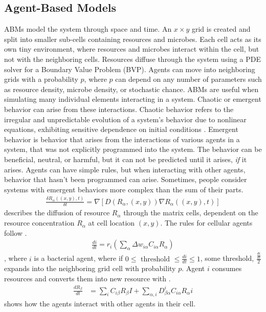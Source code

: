 \subsection{Agent-Based Models}
ABMs model the system through space and time.
An $x \times y$ grid is created and split into smaller sub-cells containing resources and microbes.
Each cell acts as its own tiny environment, where resources and microbes interact within the cell, but not with the neighboring cells.
Resources diffuse through the system using a PDE solver for a Boundary Value Problem (BVP).
Agents can move into neighboring grids with a probability $p$, where $p$ can depend on any number of parameters such as resource density, microbe density, or stochastic chance. \newline 
ABMs are useful when simulating many individual elements interacting in a system.
Chaotic or emergent behavior can arise from these interactions.
Chaotic behavior refers to the irregular and unpredictable evolution of a system's behavior due to nonlinear equations, exhibiting sensitive dependence on initial conditions \cite{encyclopedia_of_physical_science_and_technology}. \newline 
Emergent behavior is behavior that arises from the interactions of various agents in a system, that was not explicitly programmed into the system.
The behavior can be beneficial, neutral, or harmful, but it can not be predicted until it arises, \textit{if} it arises.
Agents can have simple rules, but when interacting with other agents, behavior that hasn't been programmed can arise.
Sometimes, people consider systems with emergent behaviors more complex than the sum of their parts. \newline
\begin{align} 
    \label{eq:resource_diffusion}
    \frac{\delta R_\alpha(\left(x, y\right), t)}{\delta t} = \nabla \left[D \left( R_\alpha, \left(x, y\right) \right) \nabla R_\alpha \left(\left(x, y\right), t \right) \right]
\end{align}
 describes the diffusion of resource $R_\alpha$ through the matrix cells, dependent on the resource concentration $R_\alpha$ at cell location $(x, y)$. 
The rules for cellular agents follow . 
\begin{align} 
    \label{eq:agent_rules}
    \frac{di}{dt} = r_i \left( \sum_\alpha \Delta w_{i\alpha}C_{i\alpha}R_\alpha\right)
\end{align}, 
where $i$ is a bacterial agent, where if $0 \leq \text{ threshold } \leq \frac{di}{dt} \leq 1$, some threshold, $\frac{\frac{di}{dt}}{2}$ expands into the neighboring grid cell with probability $p$. 
Agent $i$ consumes resources and converts them into new resource with . 
\begin{align} 
    \label{eq:agent_consumption_and_conversion}
    \frac{dR_\beta}{dt} &= \sum_i C_{i\beta}R_\beta I + \sum_{\alpha, i}D_{\beta \alpha}^{i} C_{i \alpha} R_\alpha i
\end{align}
 shows how the agents interact with other agents in their cell. 

